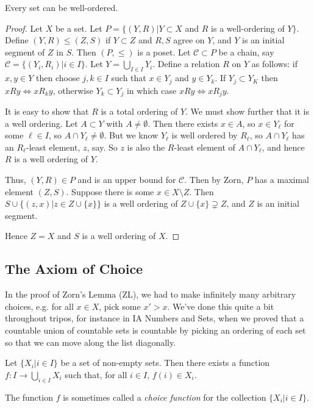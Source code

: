 \documentclass[10pt,a4paper]{article}
\begin{document}
\begin{corollary}
Every set can be well-ordered.
\end{corollary}
\begin{proof}
Let $X$ be a set. Let $P = \{(Y,R) | Y\subset X$ and $R$ is a well-ordering of $Y\}$. Define $(Y,R)\leq (Z,S)$ if $Y \subset Z$ and $R,S$ agree on $Y$, and $Y$ is an initial segment of $Z$ in $S$. Then $(P, \leq)$ is a poset. Let $\mathscr{C} \subset P$ be a chain, say $\mathscr{C} = \{(Y_i, R_i) | i \in I\}$. Let $Y = \bigcup_{I \in I} Y_i$. Define a relation $R$ on $Y$ as follows: if $x,y \in Y$ then choose $j, k \in I$ such that $x \in Y_j$ and $y \in Y_k$. If $Y_j \subset Y_K$ then $xRy \iff xR_k y$, otherwise $Y_k \subset Y_j$ in which case $xRy \iff xR_j y$.

It is easy to show that $R$ is a total ordering of $Y$. We must show further that it is a well ordering. Let $A \subset Y$ with $A \neq \emptyset$. Then there exists $x \in A$, so $x \in Y_{\ell}$ for some $\ell \in I$, so $A \cap Y_{\ell} \neq \emptyset$. But we know $Y_{\ell}$ is well ordered by $R_{\ell}$, so $A \cap Y_{\ell}$ has an $R_\ell$-least element, $z$, say. So $z$ is also the $R$-least element of $A \cap Y_\ell$, and hence $R$ is a well ordering of $Y$.

Thus, $(Y,R) \in P$ and is an upper bound for $\mathscr{C}$. Then by Zorn, $P$ has a maximal element $(Z,S)$. Suppose there is some $x \in X \setminus Z$. Then $S \cup \{(z, x) | z \in Z \cup \{x\}\}$ is a well ordering of $Z \cup \{x\} \supsetneq Z$, and $Z$ is an initial segment. \contr

Hence $Z = X$ and $S$ is a well ordering of $X$.
\end{proof}
\subsection{The Axiom of Choice}
In the proof of Zorn's Lemma (ZL), we had to make infinitely many arbitrary choices, e.g. for all $x \in X$, pick some $x' > x$. We've done this quite a bit throughout tripos, for instance in IA Numbers and Sets, when we proved that a countable union of countable sets is countable by picking an ordering of each set so that we can move along the list diagonally.

\begin{axiom}
Let $\{X_i | i \in I\}$ be a set of non-empty sets. Then there exists a function $f: I \to \bigcup_{i \in I}X_i$ such that, for all $i \in I$, $f(i) \in X_i$.
\end{axiom}
The function $f$ is sometimes called a \emph{choice function} for the collection $\{X_i|i \in I\}$.
\end{document}
